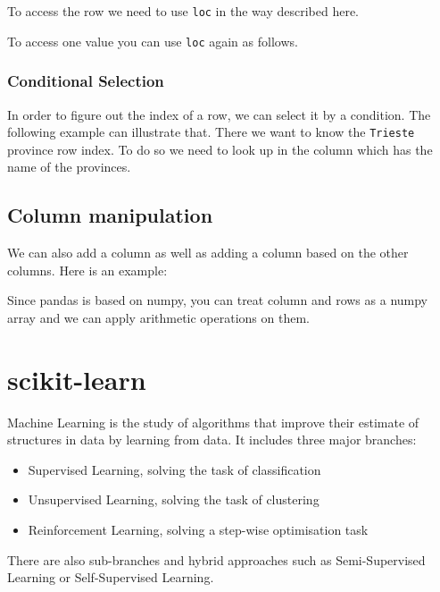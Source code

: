 \documentclass[10pt,a4paper]{article}
\newcommand{\te}{\texttt}
\begin{document}
To access the row we need to use \te{loc} in the way described here.

To access one value you can use \te{loc} again as follows. 

\subsubsection{Conditional Selection}
In order to figure out the index of a row, we can select it by a condition. The following example can illustrate that. There we want to know the \te{Trieste} province row index. To do so we need to look up in the column which has the name of the provinces.


\subsection{Column manipulation}
We can also add a column as well as adding a column based on the other columns. Here is an example:

Since pandas is based on numpy, you can treat column and rows as a numpy array and we can apply arithmetic operations on them.






















\section{scikit-learn}
Machine Learning is the study of algorithms that improve their estimate of structures in data by learning from data. It includes three major branches:
\begin{itemize}
\item Supervised Learning, solving the task of classification
\item Unsupervised Learning, solving the task of clustering
\item Reinforcement Learning, solving a step-wise optimisation task
\end{itemize}
There are also sub-branches and hybrid approaches such as Semi-Supervised Learning or Self-Supervised Learning.
\end{document}

